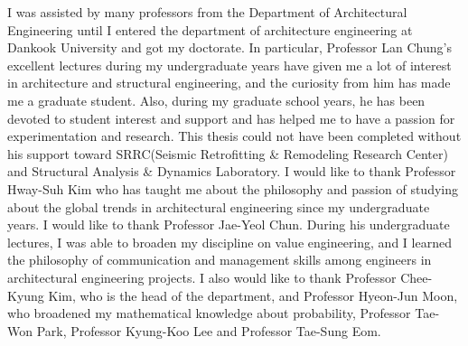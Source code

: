 I was assisted by many professors from the Department of Architectural Engineering until I entered the department of architecture engineering at Dankook University and got my doctorate. In particular, Professor Lan Chung's excellent lectures during my undergraduate years have given me a lot of interest in architecture and structural engineering, and the curiosity from him has made me a graduate student. Also, during my graduate school years, he has been devoted to student interest and support and has helped me to have a passion for experimentation and research. This thesis could not have been completed without his support toward SRRC(Seismic Retrofitting \& Remodeling Research Center) and Structural Analysis \& Dynamics Laboratory. I would like to thank Professor Hway-Suh Kim who has taught me about the philosophy and passion of studying about the global trends in architectural engineering since my undergraduate years. I would like to thank Professor Jae-Yeol Chun. During his undergraduate lectures, I was able to broaden my discipline on value engineering, and I learned the philosophy of communication and management skills among engineers in architectural engineering projects. I also would like to thank Professor Chee-Kyung Kim, who is the head of the department, and Professor Hyeon-Jun Moon, who broadened my mathematical knowledge about probability, Professor Tae-Won Park, Professor Kyung-Koo Lee and Professor Tae-Sung Eom.

